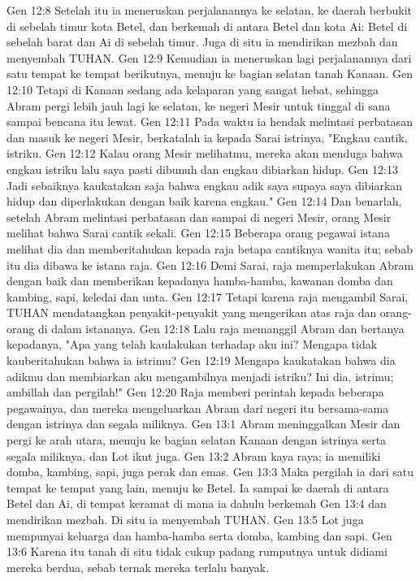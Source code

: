 Gen 12:8  Setelah itu ia meneruskan perjalanannya ke selatan, ke daerah berbukit di sebelah timur kota Betel, dan berkemah di antara Betel dan kota Ai: Betel di sebelah barat dan Ai di sebelah timur. Juga di situ ia mendirikan mezbah dan menyembah TUHAN.
Gen 12:9  Kemudian ia meneruskan lagi perjalanannya dari satu tempat ke tempat berikutnya, menuju ke bagian selatan tanah Kanaan.
Gen 12:10  Tetapi di Kanaan sedang ada kelaparan yang sangat hebat, sehingga Abram pergi lebih jauh lagi ke selatan, ke negeri Mesir untuk tinggal di sana sampai bencana itu lewat.
Gen 12:11  Pada waktu ia hendak melintasi perbatasan dan masuk ke negeri Mesir, berkatalah ia kepada Sarai istrinya, "Engkau cantik, istriku.
Gen 12:12  Kalau orang Mesir melihatmu, mereka akan menduga bahwa engkau istriku lalu saya pasti dibunuh dan engkau dibiarkan hidup.
Gen 12:13  Jadi sebaiknya kaukatakan saja bahwa engkau adik saya supaya saya dibiarkan hidup dan diperlakukan dengan baik karena engkau."
Gen 12:14  Dan benarlah, setelah Abram melintasi perbatasan dan sampai di negeri Mesir, orang Mesir melihat bahwa Sarai cantik sekali.
Gen 12:15  Beberapa orang pegawai istana melihat dia dan memberitahukan kepada raja betapa cantiknya wanita itu; sebab itu dia dibawa ke istana raja.
Gen 12:16  Demi Sarai, raja memperlakukan Abram dengan baik dan memberikan kepadanya hamba-hamba, kawanan domba dan kambing, sapi, keledai dan unta.
Gen 12:17  Tetapi karena raja mengambil Sarai, TUHAN mendatangkan penyakit-penyakit yang mengerikan atas raja dan orang-orang di dalam istananya.
Gen 12:18  Lalu raja memanggil Abram dan bertanya kepadanya, "Apa yang telah kaulakukan terhadap aku ini? Mengapa tidak kauberitahukan bahwa ia istrimu?
Gen 12:19  Mengapa kaukatakan bahwa dia adikmu dan membiarkan aku mengambilnya menjadi istriku? Ini dia, istrimu; ambillah dan pergilah!"
Gen 12:20  Raja memberi perintah kepada beberapa pegawainya, dan mereka mengeluarkan Abram dari negeri itu bersama-sama dengan istrinya dan segala miliknya.
Gen 13:1  Abram meninggalkan Mesir dan pergi ke arah utara, menuju ke bagian selatan Kanaan dengan istrinya serta segala miliknya, dan Lot ikut juga.
Gen 13:2  Abram kaya raya; ia memiliki domba, kambing, sapi, juga perak dan emas.
Gen 13:3  Maka pergilah ia dari satu tempat ke tempat yang lain, menuju ke Betel. Ia sampai ke daerah di antara Betel dan Ai, di tempat keramat di mana ia dahulu berkemah
Gen 13:4  dan mendirikan mezbah. Di situ ia menyembah TUHAN.
Gen 13:5  Lot juga mempunyai keluarga dan hamba-hamba serta domba, kambing dan sapi.
Gen 13:6  Karena itu tanah di situ tidak cukup padang rumputnya untuk didiami mereka berdua, sebab ternak mereka terlalu banyak.
